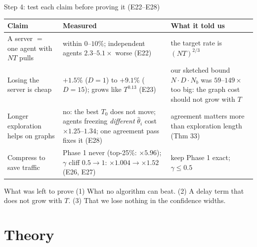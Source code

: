 \documentclass[11pt]{beamer}
\begin{document}
\begin{frame}{Step 4: test each claim before proving it (E22--E28)}
\scriptsize
\renewcommand{\arraystretch}{1.25}
\begin{tabular}{@{}>{\raggedright\arraybackslash}p{3.4cm}>{\raggedright\arraybackslash}p{4.0cm}>{\raggedright\arraybackslash}p{3.2cm}@{}}
\toprule
\textbf{Claim} & \textbf{Measured} & \textbf{What it told us}\\
\midrule
A server $=$ one agent with $NT$ pulls & within $0$--$10\%$; independent agents $2.3$--$5.1\times$ worse (E22) & the target rate is $(NT)^{2/3}$\\
Losing the server is cheap & $+1.5\%$ ($D{=}1$) to $+9.1\%$ ($D{=}15$); grows like $T^{0.13}$ (E23) & \alert{our sketched bound $N\cdot D\cdot N_b$ was $59$--$149\times$ too big}: the graph cost should not grow with $T$\\
Longer exploration helps on graphs & no: the best $T_0$ does not move; agents freezing \emph{different} $\hat\theta_i$ cost $\times1.25$--$1.34$; one agreement pass fixes it (E28) & agreement matters more than exploration length (Thm 33)\\
Compress to save traffic & Phase 1 never (top-25\%: $\times5.96$); $\gamma$ cliff $0.5\to1$: $\times1.004\to\times1.52$ (E26, E27) & keep Phase 1 exact; $\gamma\le0.5$\\
\bottomrule
\end{tabular}
\vspace{0.5em}
\begin{alertblock}{What was left to prove}
(1) What no algorithm can beat. (2) A delay term that does not grow with $T$. (3) That we lose nothing in the confidence widths.
\end{alertblock}
\end{frame}

\section{Theory}
\end{document}
